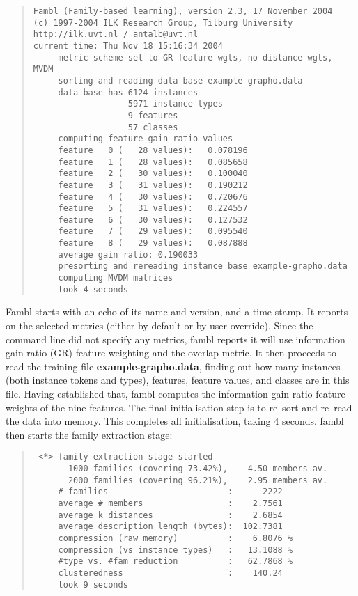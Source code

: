 \documentclass[11pt]{article}
\begin{document}
\begin{quote}
{\tiny
\begin{verbatim}
Fambl (Family-based learning), version 2.3, 17 November 2004
(c) 1997-2004 ILK Research Group, Tilburg University
http://ilk.uvt.nl / antalb@uvt.nl
current time: Thu Nov 18 15:16:34 2004
     metric scheme set to GR feature wgts, no distance wgts, MVDM
     sorting and reading data base example-grapho.data
     data base has 6124 instances
                   5971 instance types
                   9 features
                   57 classes
     computing feature gain ratio values
     feature   0 (   28 values):   0.078196
     feature   1 (   28 values):   0.085658
     feature   2 (   30 values):   0.100040
     feature   3 (   31 values):   0.190212
     feature   4 (   30 values):   0.720676
     feature   5 (   31 values):   0.224557
     feature   6 (   30 values):   0.127532
     feature   7 (   29 values):   0.095540
     feature   8 (   29 values):   0.087888
     average gain ratio: 0.190033
     presorting and rereading instance base example-grapho.data
     computing MVDM matrices
     took 4 seconds
\end{verbatim}
}
\end{quote}

{\sc Fambl} starts with an echo of its name and version, and a time
stamp. It reports on the selected metrics (either by default or by
user override). Since the command line did not specify any metrics,
{\sc fambl} reports it will use information gain ratio (GR) feature
weighting and the overlap metric. It then proceeds to read the training
file {\bf example-grapho.data}, finding out how many instances (both
instance tokens and types), features, feature values, and classes are
in this file. Having established that, {\sc fambl} computes the
information gain ratio feature weights of the nine features. The final
initialisation step is to re--sort and re--read the data into
memory. This completes all initialisation, taking 4 seconds. {\sc
fambl} then starts the family extraction stage:

\begin{quote}
{\tiny
\begin{verbatim}
 <*> family extraction stage started
       1000 families (covering 73.42%),    4.50 members av.
       2000 families (covering 96.21%),    2.95 members av.
     # families                        :      2222
     average # members                 :    2.7561
     average k distances               :    2.6854
     average description length (bytes):  102.7381
     compression (raw memory)          :    6.8076 %
     compression (vs instance types)   :   13.1088 %
     #type vs. #fam reduction          :   62.7868 %
     clusteredness                     :    140.24
     took 9 seconds
\end{verbatim}
}
\end{quote}
\end{document}
